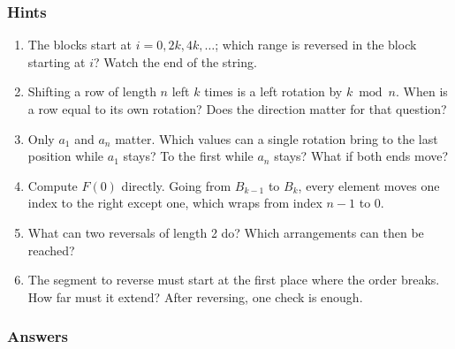 \subsubsection*{Hints}
\begin{enumerate}[leftmargin=*, label=\textbf{E3.\arabic*}]
    \item The blocks start at $i = 0, 2k, 4k, \dots$; which range is reversed in the block starting at $i$? Watch the end of the string.
    \item Shifting a row of length $n$ left $k$ times is a left rotation by $k \bmod n$. When is a row equal to its own rotation? Does the direction matter for that question?
    \item Only $a_1$ and $a_n$ matter. Which values can a single rotation bring to the last position while $a_1$ stays? To the first while $a_n$ stays? What if both ends move?
    \item Compute $F(0)$ directly. Going from $B_{k-1}$ to $B_k$, every element moves one index to the right except one, which wraps from index $n-1$ to $0$.
    \item What can two reversals of length 2 do? Which arrangements can then be reached?
    \item The segment to reverse must start at the first place where the order breaks. How far must it extend? After reversing, one check is enough.
\end{enumerate}

\subsubsection*{Answers}

